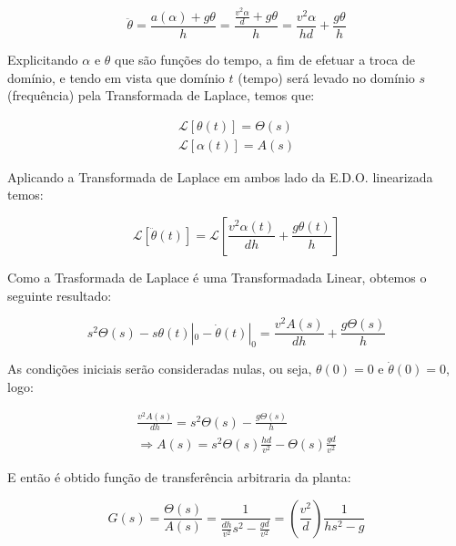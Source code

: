 \documentclass[conference,harvard,brazil,english]{sbatex}
\begin{document}
                \begin{equation}
                    \ddot\theta = \frac{a(\alpha) + g\theta}{h} = \frac{ \frac{v^2\alpha}{d} + g\theta}{h} =  \frac{v^2\alpha}{hd} + \frac{g\theta}{h}
                \end{equation}
                
            Explicitando $\alpha$ e $\theta$ que são funções do tempo, a fim de efetuar a troca de domínio, e tendo em vista que domínio $t$ (tempo) será levado no domínio $s$ (frequência) pela Transformada de Laplace, temos que:
            
            \begin{eqnarray}
                \mathcal{L} [\theta(t)] = \Theta(s)   \nonumber \\
                \mathcal{L} [\alpha(t)] = A(s)
            \end{eqnarray}
            
            Aplicando a Transformada de Laplace em ambos lado da E.D.O. linearizada temos:
            
            \begin{equation}
                 \mathcal{L} [\ddot\theta(t)] = \mathcal{L} [\frac{v^2\alpha(t)}{dh} + \frac{g\theta(t)}{h}]
            \end{equation}
            
            Como a Trasformada de Laplace é uma Transformadada Linear, obtemos o seguinte resultado:
            
            \begin{equation}
                s^2\Theta(s) - s\theta(t)|_0 - \dot\theta(t)|_0 = \frac{v^2A(s)}{dh} + \frac{g\Theta(s)}{h}
            \end{equation}
            
            As condições iniciais serão consideradas nulas, ou seja, $\theta(0) = 0$ e $\dot\theta(0)=0$, logo:
            
            \begin{eqnarray}
                \frac{v^2A(s)}{dh} = s^2\Theta(s) - \frac{g\Theta(s)}{h} \nonumber \\
                \Rightarrow    A(s) = s^2\Theta(s)\frac{hd}{v^2} - \Theta(s)\frac{gd}{v^2}
            \end{eqnarray}
            
            
            E então é obtido função de transferência arbitraria da planta:
            
            \begin{equation}
                G(s)= \frac{\Theta(s)}{A(s)} = \frac{1}{\frac{dh}{v^2}s^2 - \frac{gd}{v^2}} = (\frac{v^2}{d})\frac{1}{h {s^2} - g}
            \end{equation}
           
\end{document}
